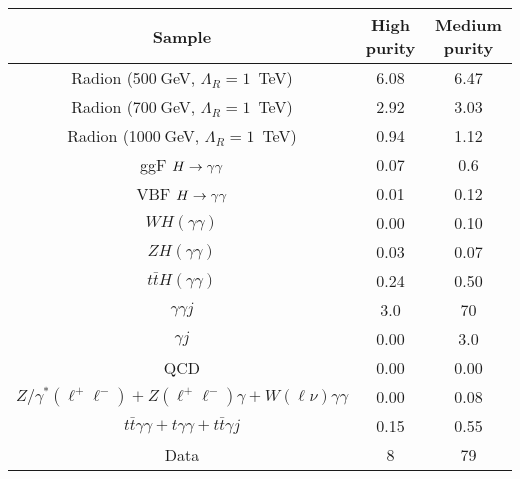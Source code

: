 \begin{tabular}{|c|c|c|}
\hline
Sample & High purity & Medium purity\\
\hline
Radion (500$~$GeV, $\Lambda_R = 1$~TeV)        &  6.08  & 6.47     \\
Radion (700$~$GeV, $\Lambda_R = 1$~TeV)        &  2.92  & 3.03     \\
Radion (1000$~$GeV, $\Lambda_R = 1$~TeV)       &  0.94  & 1.12     \\
\hline
ggF $H\to\gamma\gamma$                &  0.07  &  0.6  \\
VBF $H\to\gamma\gamma$                &  0.01  &  0.12 \\
$WH(\gamma\gamma)$        &  0.00  &  0.10 \\
$ZH(\gamma\gamma)$        &  0.03  &  0.07 \\
$t\bar{t}H(\gamma\gamma)$ &  0.24  &  0.50 \\
\hline
$\gamma\gamma j$                      & 3.0  &  70   \\
$\gamma j$                            & 0.00 &  3.0  \\
QCD                                   & 0.00 &  0.00 \\
$Z/\gamma^*(\ell^+\ell^-) + Z(\ell^+\ell^-)\gamma + W(\ell\nu)\gamma\gamma$ & 0.00 &  0.08 \\
$t\bar{t}\gamma\gamma + t\gamma\gamma + t\bar{t}\gamma j$ & 0.15 &  0.55 \\
\hline
Data                                  & 8 & 79 \\
\hline
\end{tabular}
